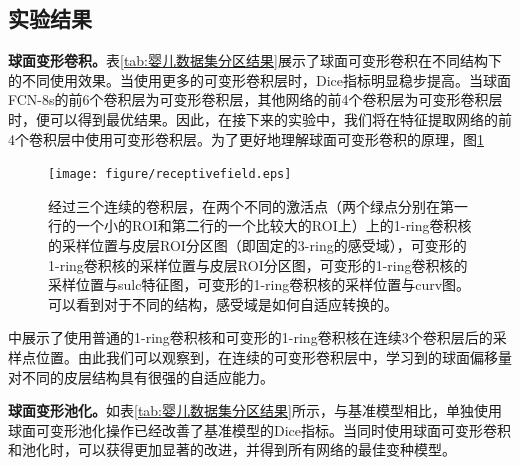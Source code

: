 \subsection{实验结果}
\textbf{球面变形卷积。}表\ref{tab:婴儿数据集分区结果}展示了球面可变形卷积在不同结构下的不同使用效果。当使用更多的可变形卷积层时，Dice指标明显稳步提高。当球面FCN-8s的前6个卷积层为可变形卷积层，其他网络的前4个卷积层为可变形卷积层时，便可以得到最优结果。因此，在接下来的实验中，我们将在特征提取网络的前4个卷积层中使用可变形卷积层。为了更好地理解球面可变形卷积的原理，图\ref{fig:receptivefield_sampling_points}
\begin{figure}[h]
	\centering
	\texttt{[image: figure/receptivefield.eps]}
	\caption{经过三个连续的卷积层，在两个不同的激活点（两个绿点分别在第一行的一个小的ROI和第二行的一个比较大的ROI上）上的1-ring卷积核的采样位置与皮层ROI分区图（即固定的3-ring的感受域），可变形的1-ring卷积核的采样位置与皮层ROI分区图，可变形的1-ring卷积核的采样位置与sulc特征图，可变形的1-ring卷积核的采样位置与curv图。可以看到对于不同的结构，感受域是如何自适应转换的。}
	\label{fig:receptivefield_sampling_points}
\end{figure}
中展示了使用普通的1-ring卷积核和可变形的1-ring卷积核在连续3个卷积层后的采样点位置。由此我们可以观察到，在连续的可变形卷积层中，学习到的球面偏移量对不同的皮层结构具有很强的自适应能力。

\textbf{球面变形池化。}如表\ref{tab:婴儿数据集分区结果}所示，与基准模型相比，单独使用球面可变形池化操作已经改善了基准模型的Dice指标。当同时使用球面可变形卷积和池化时，可以获得更加显著的改进，并得到所有网络的最佳变种模型。

